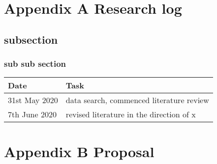 \documentclass[
  12pt,
  oneside]{book}
\begin{document}
\printbibliography

\hypertarget{appendix-a-research-log}{%
\chapter*{Appendix A Research log}\label{appendix-a-research-log}}


\hypertarget{subsection}{%
\section*{subsection}\label{subsection}}

\hypertarget{sub-sub-section}{%
\subsection*{sub sub section}\label{sub-sub-section}}

\begin{table}
\centering
\begin{tabular}{ll}
\toprule
\textbf{Date} & \textbf{Task}\\
\midrule
31st May 2020 & data search, commenced literature review\\
7th June 2020 & revised literature in the direction of x\\
\bottomrule
\end{tabular}
\end{table}

\hypertarget{appendix-b-proposal}{%
\chapter*{Appendix B Proposal}\label{appendix-b-proposal}}

\enddocument

\printbibliography
\end{document}
